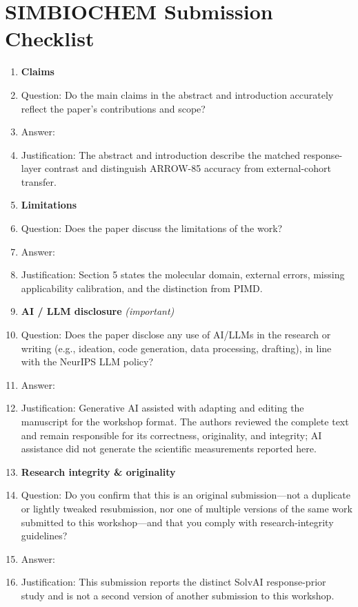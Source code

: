 \section*{SIMBIOCHEM Submission Checklist}
\begin{enumerate}
\item {\bf Claims}
  \item[] Question: Do the main claims in the abstract and introduction accurately
  reflect the paper's contributions and scope?
  \item[] Answer: \answerYes{}
  \item[] Justification: The abstract and introduction describe the matched
  response-layer contrast and distinguish ARROW-85 accuracy from external-cohort
  transfer.

\item {\bf Limitations}
  \item[] Question: Does the paper discuss the limitations of the work?
  \item[] Answer: \answerYes{}
  \item[] Justification: Section 5 states the molecular domain, external errors,
  missing applicability calibration, and the distinction from PIMD.

\item {\bf AI / LLM disclosure} \emph{(important)}
  \item[] Question: Does the paper disclose any use of AI/LLMs in the research or
  writing (e.g., ideation, code generation, data processing, drafting), in line with
  the NeurIPS LLM policy?
  \item[] Answer: \answerYes{}
  \item[] Justification: Generative AI assisted with adapting and editing the
  manuscript for the workshop format. The authors reviewed the complete text and
  remain responsible for its correctness, originality, and integrity; AI assistance
  did not generate the scientific measurements reported here.

\item {\bf Research integrity \& originality}
  \item[] Question: Do you confirm that this is an original submission---not a
  duplicate or lightly tweaked resubmission, nor one of multiple versions of the same
  work submitted to this workshop---and that you comply with research-integrity
  guidelines?
  \item[] Answer: \answerYes{}
  \item[] Justification: This submission reports the distinct SolvAI response-prior
  study and is not a second version of another submission to this workshop.


\end{enumerate}
